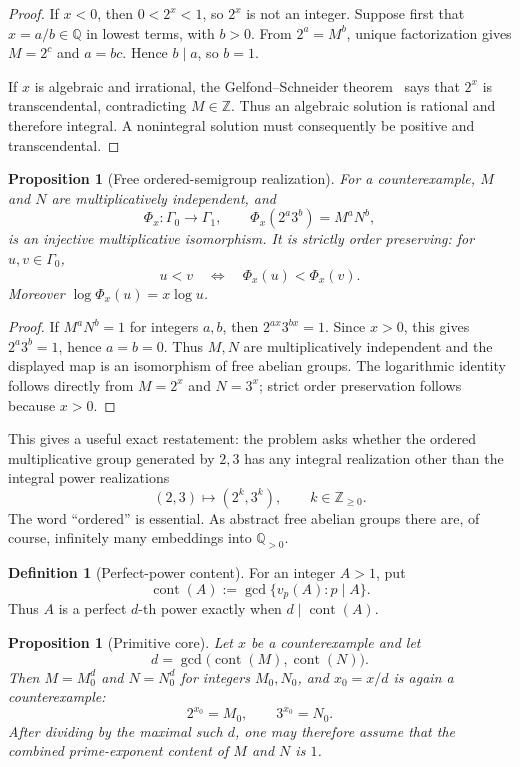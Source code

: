 \documentclass[11pt]{article}
\newtheorem{proposition}[theorem]{Proposition}
\theoremstyle{definition}
\newtheorem{definition}[theorem]{Definition}
\newcommand{\Q}{\mathbb{Q}}
\newcommand{\Z}{\mathbb{Z}}
\newcommand{\Gammao}{\Gamma_0}
\newcommand{\Gammai}{\Gamma_1}
\begin{document}
\begin{proof}
If $x<0$, then $0<2^x<1$, so $2^x$ is not an integer.  Suppose first that
$x=a/b\in\Q$ in lowest terms, with $b>0$.  From $2^a=M^b$, unique
factorization gives $M=2^c$ and $a=bc$.  Hence $b\mid a$, so $b=1$.

If $x$ is algebraic and irrational, the Gelfond--Schneider theorem~\cite{Gelfond,Schneider} says that
$2^x$ is transcendental, contradicting $M\in\Z$.  Thus an algebraic solution
is rational and therefore integral.  A nonintegral solution must consequently
be positive and transcendental.
\end{proof}

\begin{proposition}[Free ordered-semigroup realization]
\label{prop:ordered-semigroup}
For a counterexample, $M$ and $N$ are multiplicatively independent, and
\[
 \Phi_x:\Gammao\longrightarrow\Gammai,
 \qquad \Phi_x(2^a3^b)=M^aN^b,
\]
is an injective multiplicative isomorphism.  It is strictly order preserving:
for $u,v\in\Gammao$,
\[
       u<v \quad\Longleftrightarrow\quad \Phi_x(u)<\Phi_x(v).
\]
Moreover $\log \Phi_x(u)=x\log u$.
\end{proposition}

\begin{proof}
If $M^aN^b=1$ for integers $a,b$, then
$2^{ax}3^{bx}=1$.  Since $x>0$, this gives $2^a3^b=1$, hence $a=b=0$.
Thus $M,N$ are multiplicatively independent and the displayed map is an
isomorphism of free abelian groups.  The logarithmic identity follows directly
from $M=2^x$ and $N=3^x$; strict order preservation follows because $x>0$.
\end{proof}

This gives a useful exact restatement: the problem asks whether the ordered
multiplicative group generated by $2,3$ has any integral realization other
than the integral power realizations
\[
          (2,3)\longmapsto(2^k,3^k),\qquad k\in\Z_{\geq0}.
\]
The word ``ordered'' is essential.  As abstract free abelian groups there are,
of course, infinitely many embeddings into $\Q_{>0}$.

\begin{definition}[Perfect-power content]
For an integer $A>1$, put
\[
  \operatorname{cont}(A):=\gcd\{v_p(A):p\mid A\}.
\]
Thus $A$ is a perfect $d$-th power exactly when $d\mid\operatorname{cont}(A)$.
\end{definition}

\begin{proposition}[Primitive core]
\label{prop:primitive-core}
Let $x$ be a counterexample and let
\[
 d=\gcd\bigl(\operatorname{cont}(M),\operatorname{cont}(N)\bigr).
\]
Then $M=M_0^d$ and $N=N_0^d$ for integers $M_0,N_0$, and $x_0=x/d$ is again a
counterexample:
\[
         2^{x_0}=M_0,
         \qquad 3^{x_0}=N_0.
\]
After dividing by the maximal such $d$, one may therefore assume that the
combined prime-exponent content of $M$ and $N$ is $1$.
\end{proposition}
\end{document}
